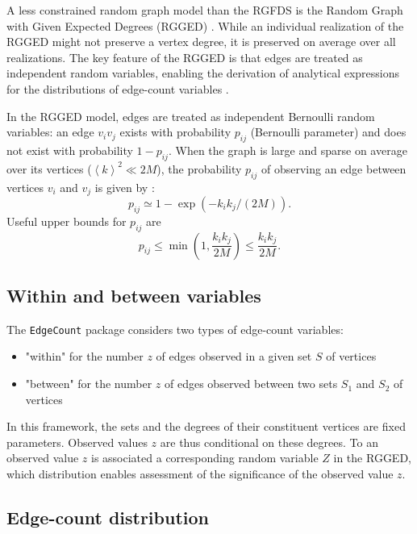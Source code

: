 \documentclass{article}\usepackage[]{graphicx}\usepackage[]{xcolor}
\begin{document}
A less constrained random graph model than the RGFDS is the Random Graph with Given Expected Degrees (RGGED) \cite{chung2002connected,RGGED2}.  While an individual realization of the RGGED might not preserve a vertex degree, it is preserved on average over all realizations. The key feature of the RGGED is that edges are treated as independent random variables, enabling the derivation of analytical expressions for the distributions of edge-count variables \cite{JCB}.

In the RGGED model, edges are treated as independent Bernoulli random variables: an edge $v_iv_j$ exists with probability $p_{ij}$ (Bernoulli parameter) and does not exist with probability $1-p_{ij}$. When the graph is large and sparse on average over its vertices ($\left< k \right>^2 \ll 2M$), the probability $p_{ij}$ of observing an edge between vertices $v_i$ and $v_j$ is given by \cite{JCB}:
\begin{equation}
p_{ij} \simeq 1 - \exp\left(-k_i k_j/(2M)\right).
\end{equation}
Useful upper bounds for $p_{ij}$ are
\begin{equation}
p_{ij} \leq \min\left( 1, \frac{k_ik_j}{2M}\right) \leq \frac{k_ik_j}{2M}.
\end{equation}

\subsection{Within and between variables}

The \texttt{EdgeCount} package considers two types of edge-count variables:
\begin{itemize}
\item "within" for the number $z$ of edges observed in a given set $S$ of vertices
\item "between" for the number $z$ of edges observed between two sets $S_1$ and $S_2$ of vertices
\end{itemize}
In this framework, the sets and the degrees of their constituent vertices are fixed parameters. Observed values $z$ are thus conditional on these degrees.
To an observed value $z$ is associated a corresponding random variable $Z$ in the RGGED, which distribution enables assessment of the significance of the observed value $z$.

\subsection{Edge-count distribution}
\end{document}
